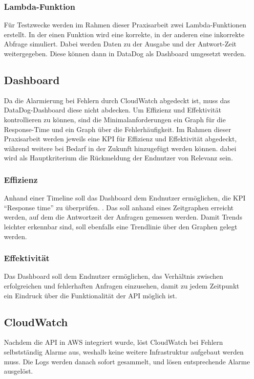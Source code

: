 \subsubsection{Lambda-Funktion}
Für Testzwecke werden im Rahmen dieser Praxisarbeit zwei Lambda-Funktionen erstellt. In der einen Funktion wird eine korrekte, in der anderen eine inkorrekte Abfrage simuliert. Dabei werden Daten zu der Ausgabe und der Antwort-Zeit weitergegeben.  Diese können dann in DataDog als Dashboard umgesetzt werden. 

\subsection{Dashboard}
Da die Alarmierung bei Fehlern durch CloudWatch abgedeckt ist, muss das DataDog-Dashboard diese nicht abdecken. Um Effizienz und Effektivität kontrollieren zu können, sind die Minimalanforderungen ein Graph für die Response-Time und ein Graph über die Fehlerhäufigkeit. Im Rahmen dieser Praxisarbeit werden jeweils eine KPI für Effizienz und Effektivität abgedeckt, während weitere bei Bedarf in der Zukunft hinzugefügt werden können. dabei wird als Hauptkriterium die Rückmeldung der Endnutzer von Relevanz sein. 

\subsubsection{Effizienz}
Anhand einer Timeline soll das Dashboard dem Endnutzer ermöglichen, die KPI ``Response time'' zu überprüfen. \cite{DatadogAWS2024}. Das soll anhand eines Zeitgraphen erreicht werden, auf dem die Antwortzeit der Anfragen gemessen werden. Damit Trends leichter erkennbar sind, soll ebenfalls eine Trendlinie über den Graphen gelegt werden. 

\subsubsection{Effektivität}
Das Dashboard soll dem Endnutzer ermöglichen, das Verhältnis zwischen erfolgreichen und fehlerhaften Anfragen einzusehen, damit zu jedem Zeitpunkt ein Eindruck über die Funktionalität der API möglich ist.

\subsection{CloudWatch}
Nachdem die API in AWS integriert wurde, löst CloudWatch bei Fehlern selbstständig Alarme aus, weshalb keine weitere Infrastruktur aufgebaut werden muss. Die Logs werden danach sofort gesammelt, und lösen entsprechende Alarme ausgelöst.
